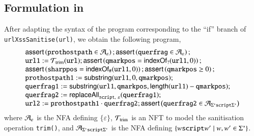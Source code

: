 \subsection{Formulation in  {\slint}}
	After adapting the syntax of the program corresponding to the ``if'' branch of {\tt urlXssSanitise(url)},  %
	we obtain the following {\slint} program,
	\[ 
	\begin{array}{l}
	\ASSERT{\mathtt{prothostpath} \in \NFA_\varepsilon}; \ASSERT{\mathtt{querfrag} \in \NFA_\varepsilon};\\
	\mathtt{url1} := \NFT_{\rm trim}(\mathtt{url}); \ASSERT{\mathtt{qmarkpos} = \indexof_?(\mathtt{url1},0)};\\
	\ASSERT{\mathtt{sharppos} = \indexof_{\#}(\mathtt{url1}, 0)}; \ASSERT{\mathtt{qmarkpos} \ge 0};\\ 
	\mathtt{prothostpath1} := \substring(\mathtt{url1}, 0, \mathtt{qmarkpos});\\
	\mathtt{querfrag1} := \substring(\mathtt{url1, qmarkpos}, \length(\mathtt{url1}) - \mathtt{qmarkpos});\\
	\mathtt{querfrag2} := \replaceall_{\mathtt{script},\ \varepsilon}(\mathtt{querfrag1});\\
	\mathtt{url2} := \mathtt{prothostpath1} \concat \mathtt{querfrag2};\ASSERT{\mathtt{querfrag2} \in \NFA_{\Sigma^*\mathtt{script}\Sigma^*}}
	\end{array}
	\]
	where $\mathcal{A}_\varepsilon$ is the NFA defining $\{\varepsilon\}$, $\mathcal{T}_{\rm trim}$ is an NFT to model the sanitisation operation {\tt trim()}, and $ \mathcal{A}_{\Sigma^*\mathtt{script}\Sigma^*}$ is the NFA defining $\{w\mbox{\tt script} w' \mid w, w' \in \Sigma^*\}$. 



